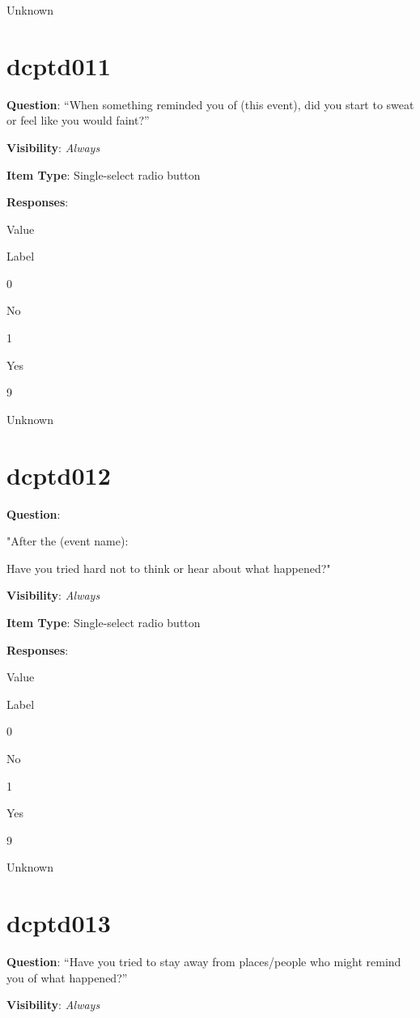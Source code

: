 \documentclass[]{book}
\begin{document}
Unknown

\hypertarget{dcptd011}{%
\section{dcptd011}\label{dcptd011}}

\textbf{Question}: ``When something reminded you of (this event), did you start to sweat or feel like you would faint?''

\textbf{Visibility}: \emph{Always}

\textbf{Item Type}: Single-select radio button

\textbf{Responses}:

Value

Label

0

No

1

Yes

9

Unknown

\hypertarget{dcptd012}{%
\section{dcptd012}\label{dcptd012}}

\textbf{Question}:

"After the (event name):

Have you tried hard not to think or hear about what happened?"

\textbf{Visibility}: \emph{Always}

\textbf{Item Type}: Single-select radio button

\textbf{Responses}:

Value

Label

0

No

1

Yes

9

Unknown

\hypertarget{dcptd013}{%
\section{dcptd013}\label{dcptd013}}

\textbf{Question}: ``Have you tried to stay away from places/people who might remind you of what happened?''

\textbf{Visibility}: \emph{Always}
\end{document}
